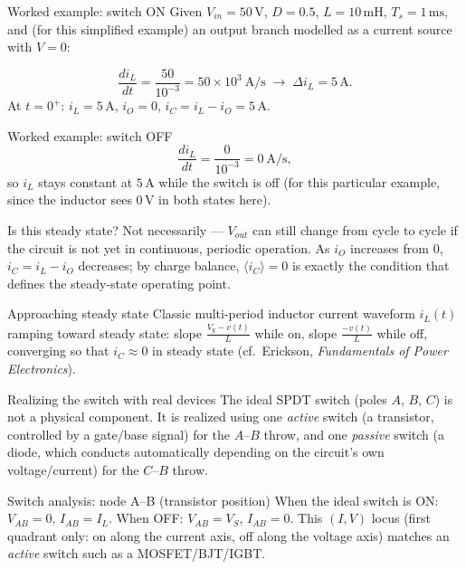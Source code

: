 \documentclass[11pt]{beamer}
\begin{document}
\begin{frame}{Worked example: switch ON}
Given $V_{in} = 50\,\text{V}$, $D = 0.5$, $L = 10\,\text{mH}$,
$T_s = 1\,\text{ms}$, and (for this simplified example) an output branch
modelled as a current source with $V = 0$:

\[
  \frac{di_L}{dt} = \frac{50}{10^{-3}} = 50\times10^{3}\ \text{A/s}
  \;\longrightarrow\; \Delta i_L = 5\,\text{A}.
\]
At $t=0^+$: $i_L = 5\,\text{A}$, $i_O = 0$, $i_C = i_L - i_O = 5\,\text{A}$.
\end{frame}

\begin{frame}{Worked example: switch OFF}
\[
  \frac{di_L}{dt} = \frac{0}{10^{-3}} = 0\ \text{A/s},
\]
so $i_L$ stays constant at $5\,\text{A}$ while the switch is off (for
this particular example, since the inductor sees $0\,\text{V}$ in both
states here).
\end{frame}

\begin{frame}{Is this steady state?}
Not necessarily --- $V_{out}$ can still change from cycle to cycle if
the circuit is not yet in continuous, periodic operation. As $i_O$
increases from $0$, $i_C = i_L - i_O$ decreases; by charge balance,
$\langle i_C \rangle = 0$ is exactly the condition that defines the
steady-state operating point.
\end{frame}

\begin{frame}{Approaching steady state}
Classic multi-period inductor current waveform $i_L(t)$ ramping toward
steady state: slope $\frac{V_g - v(t)}{L}$ while on, slope
$\frac{-v(t)}{L}$ while off, converging so that $i_C \approx 0$ in
steady state (cf.\ Erickson, \emph{Fundamentals of Power Electronics}).
\end{frame}

\begin{frame}{Realizing the switch with real devices}
The ideal SPDT switch (poles $A$, $B$, $C$) is not a physical component.
It is realized using one \emph{active} switch (a transistor, controlled
by a gate/base signal) for the $A$--$B$ throw, and one \emph{passive}
switch (a diode, which conducts automatically depending on the
circuit's own voltage/current) for the $C$--$B$ throw.
\end{frame}

\begin{frame}{Switch analysis: node A--B (transistor position)}
When the ideal switch is ON: $V_{AB} = 0$, $I_{AB} = I_L$. When OFF:
$V_{AB} = V_S$, $I_{AB} = 0$. This $(I,V)$ locus (first quadrant only:
on along the current axis, off along the voltage axis) matches an
\emph{active} switch such as a MOSFET/BJT/IGBT.
\end{frame}
\end{document}
